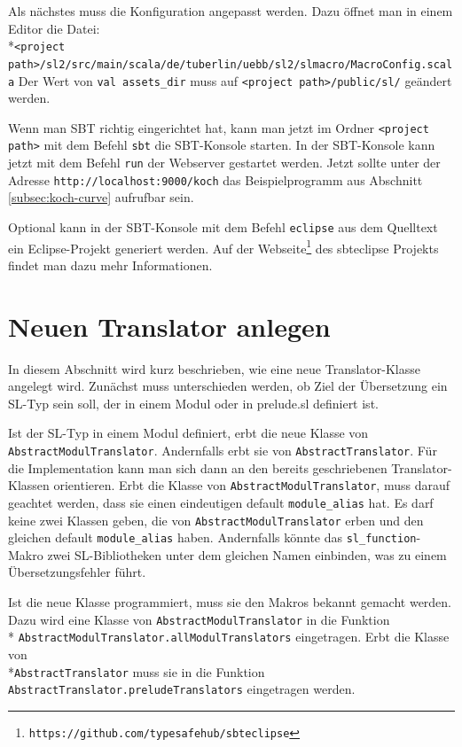 \documentclass[12pt,bibtotoc]{scrreprt}
\begin{document}
Als nächstes muss die Konfiguration angepasst werden. Dazu öffnet man in einem Editor die Datei: \\*\lstinline!<project path>/sl2/src/main/scala/de/tuberlin/uebb/sl2/slmacro/MacroConfig.scala! Der Wert von \lstinline!val assets_dir! muss auf \lstinline!<project path>/public/sl/! geändert werden.

Wenn man SBT richtig eingerichtet hat, kann man jetzt im Ordner \lstinline!<project path>! mit dem Befehl \lstinline!sbt! die SBT-Konsole starten. In der SBT-Konsole kann jetzt mit dem Befehl \lstinline!run! der Webserver gestartet werden. Jetzt sollte unter der Adresse \lstinline!http://localhost:9000/koch! das Beispielprogramm aus Abschnitt \ref{subsec:koch-curve} aufrufbar sein.

Optional kann in der SBT-Konsole mit dem Befehl \lstinline!eclipse! aus dem Quelltext ein Eclipse-Projekt generiert werden. Auf der Webseite\footnote{\lstinline!https://github.com/typesafehub/sbteclipse!} des sbteclipse Projekts findet man dazu mehr Informationen.


\section{Neuen Translator anlegen}
\label{sec:new-translator-class}

In diesem Abschnitt wird kurz beschrieben, wie eine neue Translator-Klasse angelegt wird. Zunächst muss unterschieden werden, ob Ziel der Übersetzung ein SL-Typ sein soll, der in einem Modul oder in prelude.sl definiert ist. 

Ist der SL-Typ in einem Modul definiert, erbt die neue Klasse von \lstinline!AbstractModulTranslator!. Andernfalls erbt sie von \lstinline!AbstractTranslator!. Für die Implementation kann man sich dann an den bereits geschriebenen Translator-Klassen orientieren. Erbt die Klasse von \lstinline!AbstractModulTranslator!, muss darauf geachtet werden, dass sie einen eindeutigen default \lstinline!module_alias! hat. Es darf keine zwei Klassen geben, die von \lstinline!AbstractModulTranslator! erben und den gleichen default \lstinline!module_alias! haben. Andernfalls könnte das \lstinline!sl_function!-Makro zwei SL-Bibliotheken unter dem gleichen Namen einbinden, was zu einem Übersetzungsfehler führt. 

Ist die neue Klasse programmiert, muss sie den Makros bekannt gemacht werden. Dazu wird eine Klasse von \lstinline!AbstractModulTranslator! in die Funktion\\* \lstinline!AbstractModulTranslator.allModulTranslators! eingetragen. Erbt die Klasse von \\*\lstinline!AbstractTranslator! muss sie in die Funktion \lstinline!AbstractTranslator.preludeTranslators! eingetragen werden.
\end{document}
